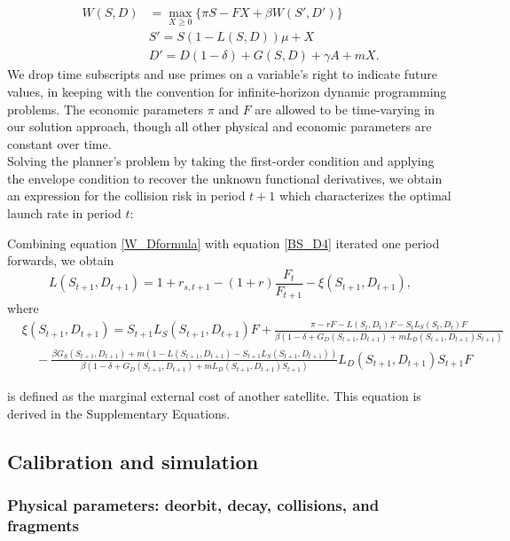 \documentclass[9pt,twoside,lineno]{pnas-new}
\begin{document}
\begin{align}
\label{plannersProblem}
W(S,D) &= \max_{X \geq 0} \{ \pi S - F X + \beta W(S',D') \} \\
& S' = S(1 - L(S,D))\mu + X \nonumber \\
& D' = D(1-\delta) + G(S,D) + \gamma A + m X \nonumber .
\end{align}
We drop time subscripts and use primes on a variable's right to indicate future values, in keeping with the convention for infinite-horizon dynamic programming problems. The economic parameters $\pi$ and $F$ are allowed to be time-varying in our solution approach, though all other physical and economic parameters are constant over time. \\

Solving the planner's problem by taking the first-order condition and applying the envelope condition to recover the unknown functional derivatives, we obtain an expression for the collision risk in period $t+1$ which characterizes the optimal launch rate in period $t$:

Combining equation \ref{W_Dformula} with equation \ref{BS_D4} iterated one period forwards, we obtain
\begin{equation}
\label{plannersFOC}
L(S_{t+1},D_{t+1}) = 1 + r_{s,t+1} - (1+r)\frac{F_t}{F_{t+1}} - \xi(S_{t+1},D_{t+1}),
\end{equation}
where
\begin{align}
&\xi(S_{t+1},D_{t+1})  = S_{t+1}L_S(S_{t+1},D_{t+1})F + \frac{\pi - rF - L(S_t,D_t)F - S_t L_S(S_t,D_t) F}{\beta (1- \delta + G_D(S_{t+1},D_{t+1}) + mL_D(S_{t+1},D_{t+1})S_{t+1} )} \nonumber \\ 
& ~~~~~ -\frac{\beta G_S(S_{t+1},D_{t+1}) + m(1 - L(S_{t+1},D_{t+1}) - S_{t+1}L_S(S_{t+1},D_{t+1}))}{\beta (1- \delta + G_D(S_{t+1},D_{t+1}) + mL_D(S_{t+1},D_{t+1})S_{t+1} )}L_D(S_{t+1},D_{t+1})S_{t+1}F
\label{MEC_formula}
\end{align}

is defined as the marginal external cost of another satellite. This equation is derived in the Supplementary Equations.

\subsection{Calibration and simulation}
\subsubsection{Physical parameters: deorbit, decay, collisions, and fragments}
\end{document}
